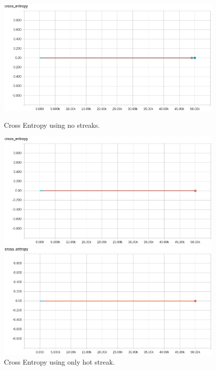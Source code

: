 \documentclass{article} %
\begin{document}
\begin{figure}[!htb]
  \includegraphics[width=\linewidth]{plots/model1/probability/streak-/crossentropy.png}
  \caption{Cross Entropy using no streaks.}\label{fig:probability--crossentropy}
\endminipage\hfill
{}
  \includegraphics[width=\linewidth]{plots/model1/probability/streak-h/crossentropy.png}
  \caption{Cross Entropy using only hot streak.}\label{fig:probability-h-crossentropy}
\endminipage\hfill
{}%
  \includegraphics[width=\linewidth]{plots/model1/probability/streak-r/crossentropy.png}

\end{figure}
\end{document}
